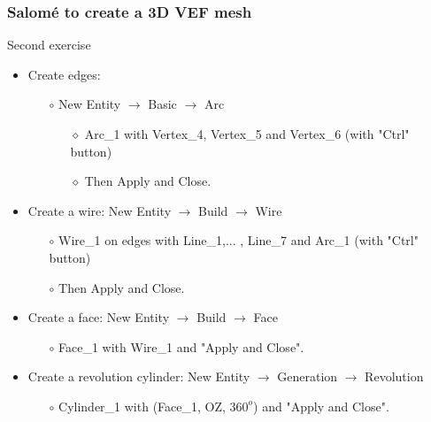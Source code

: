 \documentclass[10pt]{beamer}
\begin{document}
\begin{frame}
\frametitle{Salom\'e to create a 3D VEF mesh}
\begin{block}{Second exercise}

\begin{itemize}
\item Create edges:
    \begin{itemize}
    \item [$\circ$] New Entity $\rightarrow$ Basic $\rightarrow$ Arc
        \begin{itemize}
        \item [$\diamond$] Arc\_1 with Vertex\_4, Vertex\_5 and Vertex\_6 (with "Ctrl" button)
        \item [$\diamond$] Then Apply and Close.
        \end{itemize}
    \end{itemize}

\item Create a wire: New Entity $\rightarrow$ Build $\rightarrow$ Wire
    \begin{itemize}
    \item [$\circ$] Wire\_1 on edges with Line\_1,... , Line\_7 and Arc\_1 (with "Ctrl" button)
    \item [$\circ$] Then Apply and Close.
    \end{itemize}

\item Create a face: New Entity $\rightarrow$ Build $\rightarrow$ Face
    \begin{itemize}
    \item [$\circ$] Face\_1 with Wire\_1 and "Apply and Close".
    \end{itemize}

\item Create a revolution cylinder: New Entity $\rightarrow$ Generation $\rightarrow$ Revolution
    \begin{itemize}
    \item [$\circ$] Cylinder\_1 with (Face\_1, OZ, $360^o$) and "Apply and Close".
    \end{itemize}
\end{itemize}

\end{block}
\end{frame}
\end{document}
